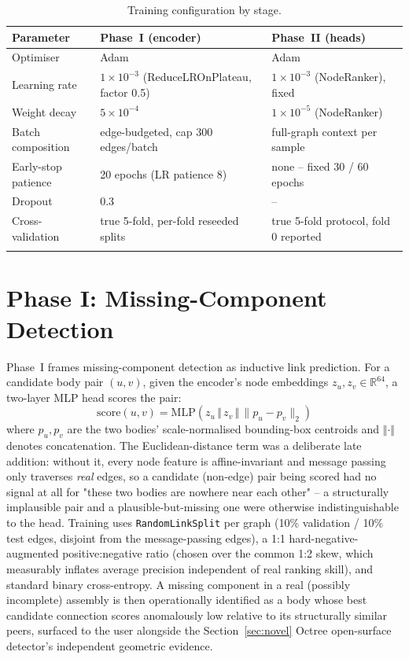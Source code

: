\documentclass[sn-mathphys,Numbered]{sn-jnl}
\begin{document}
\begin{table}[h]
\caption{Training configuration by stage.}\label{tab:hyperparams}
\begin{tabularx}{\linewidth}{@{}lXX@{}}
\toprule
Parameter & Phase~I (encoder) & Phase~II (heads) \\
\midrule
Optimiser & Adam & Adam \\
Learning rate & $1\times10^{-3}$ (ReduceLROnPlateau, factor 0.5) & $1\times10^{-3}$ (NodeRanker), fixed \\
Weight decay & $5\times10^{-4}$ & $1\times10^{-5}$ (NodeRanker) \\
Batch composition & edge-budgeted, cap 300 edges/batch & full-graph context per sample \\
Early-stop patience & 20 epochs (LR patience 8) & none -- fixed 30 / 60 epochs \\
Dropout & 0.3 & -- \\
Cross-validation & true 5-fold, per-fold reseeded splits & true 5-fold protocol, fold 0 reported \\
\botrule
\end{tabularx}
\end{table}

\section{Phase I: Missing-Component Detection}\label{sec:phase1}

Phase~I frames missing-component detection as inductive link prediction. For a candidate body pair $(u,v)$, given the encoder's node embeddings $z_u, z_v \in \mathbb{R}^{64}$, a two-layer MLP head scores the pair:
\begin{equation}
\text{score}(u,v) = \text{MLP}\!\left(z_u \,\Vert\, z_v \,\Vert\, \lVert p_u - p_v \rVert_2\right)
\label{eq:linkscore}
\end{equation}
where $p_u, p_v$ are the two bodies' scale-normalised bounding-box centroids and $\Vert \cdot \Vert$ denotes concatenation. The Euclidean-distance term was a deliberate late addition: without it, every node feature is affine-invariant and message passing only traverses \emph{real} edges, so a candidate (non-edge) pair being scored had no signal at all for "these two bodies are nowhere near each other" -- a structurally implausible pair and a plausible-but-missing one were otherwise indistinguishable to the head. Training uses \texttt{RandomLinkSplit} per graph (10\% validation / 10\% test edges, disjoint from the message-passing edges), a 1:1 hard-negative-augmented positive:negative ratio (chosen over the common 1:2 skew, which measurably inflates average precision independent of real ranking skill), and standard binary cross-entropy. A missing component in a real (possibly incomplete) assembly is then operationally identified as a body whose best candidate connection scores anomalously low relative to its structurally similar peers, surfaced to the user alongside the Section~\ref{sec:novel} Octree open-surface detector's independent geometric evidence.
\end{document}
